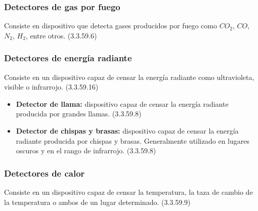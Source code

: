 \subsubsection{Detectores de gas por fuego}

Consiste en dispositivo que detecta gases producidos por fuego como $CO_{2}$, $CO$, $N_{2}$, $H_{2}$, entre otros. (3.3.59.6)


\subsubsection{Detectores de energía radiante}

Consiste en un dispositivo capaz de censar la energía radiante como ultravioleta, visible o infrarrojo. (3.3.59.16)


\begin{itemize}
	
	\item \textbf{Detector de llama:} dispositivo capaz de censar la energía radiante producida por grandes llamas. (3.3.59.8)
	
	\item \textbf{Detector de chispas y brasas:} dispositivo capaz de censar la energía radiante producida por chispas y brasas. Generalmente utilizado en lugares oscuros y en el rango de infrarrojo. (3.3.59.8)
	
\end{itemize}



\subsubsection{Detectores de calor}

Consiste en un dispositivo capaz de censar la temperatura, la taza de cambio de la temperatura o ambos de un lugar determinado. (3.3.59.9)


